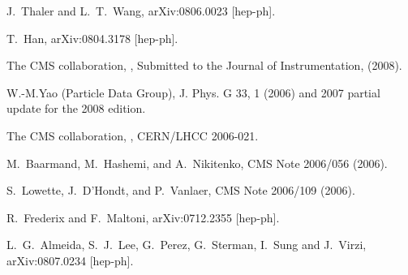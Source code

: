 \documentclass{cimento}
\begin{document}
\begin{thebibliography}{0}

 J.~Thaler and L.~T.~Wang,
  arXiv:0806.0023 [hep-ph].

 T.~Han,
  arXiv:0804.3178 [hep-ph].

 The CMS collaboration, ,
Submitted to the Journal of Instrumentation, (2008).

 W.-M.Yao \etal (Particle Data Group), 
J. Phys. G 33, 1 (2006) and 2007 partial update for the 2008 edition.

 The CMS collaboration, ,
CERN/LHCC 2006-021.

 M.~Baarmand, M.~Hashemi, and A.~Nikitenko, CMS Note 2006/056 (2006).


 S.~Lowette, J.~D'Hondt, and P.~Vanlaer, CMS Note 2006/109 (2006).

 R.~Frederix and F.~Maltoni,
  arXiv:0712.2355 [hep-ph].

 L.~G.~Almeida, S.~J.~Lee, G.~Perez, G.~Sterman, I.~Sung and J.~Virzi,
  arXiv:0807.0234 [hep-ph].

\end{thebibliography}
\end{document}
